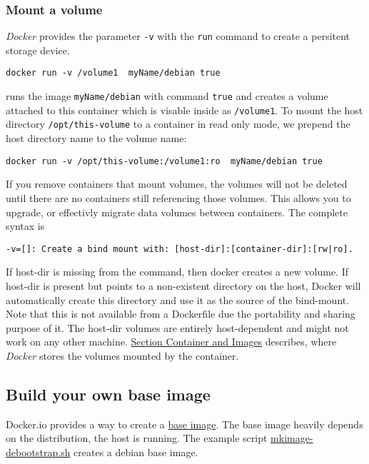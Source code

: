 \documentclass[11pt]{article}
\begin{document}
\subsubsection{Mount a volume}
\label{sec-2-3-13}

\emph{Docker} provides the parameter \texttt{-v} with the \texttt{run} command to create a persitent storage device. 

\begin{verbatim}
docker run -v /volume1  myName/debian true
\end{verbatim}
runs the image \texttt{myName/debian} with command \texttt{true} and creates a volume  attached to this container which is visable inside as \texttt{/volume1}. 
To mount the host directory \texttt{/opt/this-volume} to a container in read only mode, we prepend the host directory name to the volume name: 

\begin{verbatim}
docker run -v /opt/this-volume:/volume1:ro  myName/debian true
\end{verbatim}
If you remove containers that mount volumes, the volumes will not be deleted until there are no containers still referencing those volumes. This allows you to upgrade, or effectivly migrate data volumes between containers.
The complete syntax is

\begin{verbatim}
-v=[]: Create a bind mount with: [host-dir]:[container-dir]:[rw|ro].
\end{verbatim}
If host-dir is missing from the command, then docker creates a new volume. If host-dir is present but points to a non-existent directory on the host, Docker will automatically create this directory and use it as the source of the bind-mount.
Note that this is not available from a Dockerfile due the portability and sharing purpose of it. The host-dir volumes are entirely host-dependent and might not work on any other machine. \hyperref[sec-2-6]{Section Container and Images} describes, where \emph{Docker} stores the volumes mounted by the container.
\subsection{Build your own base image}
\label{sec-2-4}

Docker.io provides a way to create a \href{http://docs.docker.io/en/latest/articles/baseimages/}{base image}. The base image heavily depends on the distribution, the host is running. The example script \href{https://github.com/dotcloud/docker/blob/master/contrib/mkimage-debootstrap.sh}{mkimage-debootstrap.sh} creates a debian base image.
\end{document}
